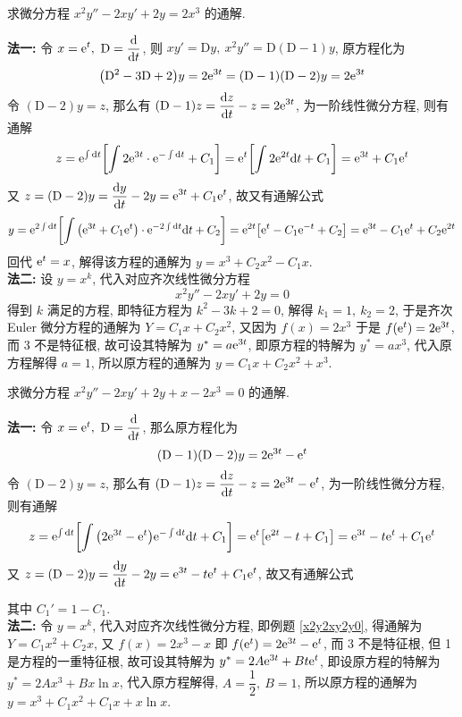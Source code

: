 \begin{example}
    \label{x2y2xy2y2x3}求微分方程 $x^2y''-2xy'+2y=2x^3$ 的通解.
\end{example}
\begin{solution}
    \textbf{法一: }令 $\displaystyle x=\mathrm{e} ^t,~\mathrm{D}=\dv{t}$, 则 $xy'=\mathrm{D}y,~x^2y''=\mathrm{D}(\mathrm{D}-1)y$,
    原方程化为 $$\qty(\mathrm{D}^2-3\mathrm{D}+2)y=2\mathrm{e} ^{3t}=(\mathrm{D}-1)(\mathrm{D}-2)y=2\mathrm{e} ^{3t}$$
    令 $(\mathrm{D}-2)y=z$, 那么有 $\displaystyle(\mathrm{D}-1)z=\dv{z}{t}-z=2\mathrm{e} ^{3t}$, 为一阶线性微分方程, 则有通解
    $$z=\mathrm{e} ^{\int\dd t}\qty[\int 2\mathrm{e} ^{3t}\cdot\mathrm{e} ^{-\int\dd t}+C_1]=\mathrm{e} ^t\qty[\int 2\mathrm{e} ^{2t}\dd t+C_1]=\mathrm{e} ^{3t}+C_1\mathrm{e} ^t$$
    又 $z=(\mathrm{D}-2)y=\displaystyle\dv{y}{t}-2y=\mathrm{e} ^{3t}+C_1\mathrm{e} ^t$, 故又有通解公式
    $$y=\mathrm{e} ^{2\int\dd t}\qty[\int\qty(\mathrm{e} ^{3t}+C_1\mathrm{e} ^t)\cdot\mathrm{e} ^{-2\int\dd t}\dd t+C_2]=\mathrm{e} ^{2t}\qty[\mathrm{e} ^t-C_1\mathrm{e} ^{-t}+C_2]=\mathrm{e} ^{3t}-C_1\mathrm{e} ^t+C_2\mathrm{e} ^{2t}$$
    回代 $\mathrm{e} ^t=x$, 解得该方程的通解为 $y=x^3+C_2x^2-C_1x.$\\
    \textbf{法二: }设 $y=x^k$, 代入对应齐次线性微分方程 $$x^2y''-2xy'+2y=0$$
    得到 $k$ 满足的方程, 即特征方程为 $k^2-3k+2=0$, 解得 $k_1=1,~k_2=2$, 于是齐次 Euler 微分方程的通解为 $Y=C_1x+C_2x^2$,
    又因为 $f(x)=2x^3$ 于是 $f\qty(\mathrm{e} ^t)=2\mathrm{e} ^{3t}$, 而 3 不是特征根, 故可设其特解为 $y^*=a\mathrm{e} ^{3t}$, 即原方程的特解为 $y^*=ax^3$, 代入原方程解得 $a=1$, 所以原方程的通解为 $y=C_1x+C_2x^2+x^3.$
\end{solution}

\begin{example}
    求微分方程 $x^2y''-2xy'+2y+x-2x^3=0$ 的通解.
\end{example}
\begin{solution}
    \textbf{法一: }令 $x=\mathrm{e} ^t,~\mathrm{D}=\displaystyle\dv{t}$, 那么原方程化为
    $$(\mathrm{D}-1)(\mathrm{D}-2)y=2\mathrm{e} ^{3t}-\mathrm{e} ^t$$
    令 $(\mathrm{D}-2)y=z$, 那么有 $(\mathrm{D}-1)z=\displaystyle\dv{z}{t}-z=2\mathrm{e} ^{3t}-\mathrm{e} ^t$, 为一阶线性微分方程, 则有通解
    $$z=\mathrm{e} ^{\int\dd t}\qty[\int\qty(2\mathrm{e} ^{3t}-\mathrm{e} ^t)\mathrm{e} ^{-\int\dd t}\dd t+C_1]=\mathrm{e} ^t\qty[\mathrm{e} ^{2t}-t+C_1]=\mathrm{e} ^{3t}-t\mathrm{e} ^{t}+C_1\mathrm{e} ^t$$
    又 $z=(\mathrm{D}-2)y=\displaystyle\dv{y}{t}-2y=\mathrm{e} ^{3t}-t\mathrm{e} ^{t}+C_1\mathrm{e} ^t$, 故又有通解公式
    其中 $C_1'=1-C_1.$\\
    \textbf{法二: }令 $y=x^k$, 代入对应齐次线性微分方程, 即例题 \ref{x2y2xy2y0}, 得通解为 $Y=C_1x^2+C_2x$,
    又 $f(x)=2x^3-x$ 即 $f\qty(\mathrm{e} ^t)=2\mathrm{e} ^{3t}-\mathrm{e} ^t$, 而 3 不是特征根, 但 1 是方程的一重特征根,
    故可设其特解为 $y^*=2A\mathrm{e} ^{3t}+Bt\mathrm{e} ^t$,
    即设原方程的特解为 $y^*=2Ax^3+Bx\ln x$, 代入原方程解得, $A=\dfrac{1}{2},~B=1$, 所以原方程的通解为
    $y=x^3+C_1x^2+C_1x+x\ln x.$
\end{solution}

